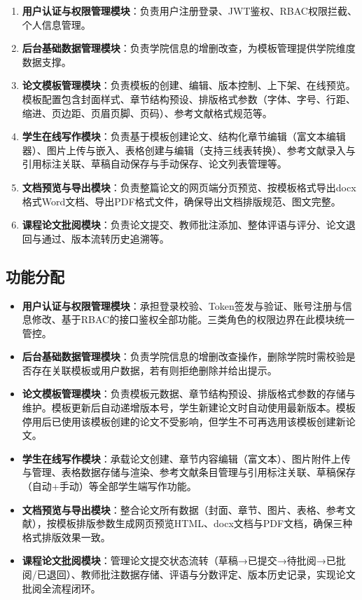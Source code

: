 \documentclass{../template/softeng}
\begin{document}
\begin{enumerate}
	\item \textbf{用户认证与权限管理模块}：负责用户注册登录、JWT鉴权、RBAC权限拦截、个人信息管理。
	
	\item \textbf{后台基础数据管理模块}：负责学院信息的增删改查，为模板管理提供学院维度数据支撑。
	
	\item \textbf{论文模板管理模块}：负责模板的创建、编辑、版本控制、上下架、在线预览。模板配置包含封面样式、章节结构预设、排版格式参数（字体、字号、行距、缩进、页边距、页眉页脚、页码）、参考文献格式规范等。
	
	\item \textbf{学生在线写作模块}：负责基于模板创建论文、结构化章节编辑（富文本编辑器）、图片上传与嵌入、表格创建与编辑（支持三线表转换）、参考文献录入与引用标注关联、草稿自动保存与手动保存、论文列表管理等。
	
	\item \textbf{文档预览与导出模块}：负责整篇论文的网页端分页预览、按模板格式导出docx格式Word文档、导出PDF格式文件，确保导出文档排版规范、图文完整。
	
	\item \textbf{课程论文批阅模块}：负责论文提交、教师批注添加、整体评语与评分、论文退回与通过、版本流转历史追溯等。
\end{enumerate}

\subsection{功能分配}

\begin{itemize}
	\item \textbf{用户认证与权限管理模块}：承担登录校验、Token签发与验证、账号注册与信息修改、基于RBAC的接口鉴权全部功能。三类角色的权限边界在此模块统一管控。
	
	\item \textbf{后台基础数据管理模块}：负责学院信息的增删改查操作，删除学院时需校验是否存在关联模板或用户数据，若有则拒绝删除并给出提示。
	
	\item \textbf{论文模板管理模块}：负责模板元数据、章节结构预设、排版格式参数的存储与维护。模板更新后自动递增版本号，学生新建论文时自动使用最新版本。模板停用后已使用该模板创建的论文不受影响，但学生不可再选用该模板创建新论文。
	
	\item \textbf{学生在线写作模块}：承载论文创建、章节内容编辑（富文本）、图片附件上传与管理、表格数据存储与渲染、参考文献条目管理与引用标注关联、草稿保存（自动+手动）等全部学生端写作功能。
	
	\item \textbf{文档预览与导出模块}：整合论文所有数据（封面、章节、图片、表格、参考文献），按模板排版参数生成网页预览HTML、docx文档与PDF文档，确保三种格式排版效果一致。
	
	\item \textbf{课程论文批阅模块}：管理论文提交状态流转（草稿→已提交→待批阅→已批阅/已退回）、教师批注数据存储、评语与分数评定、版本历史记录，实现论文批阅全流程闭环。
\end{itemize}
\end{document}
